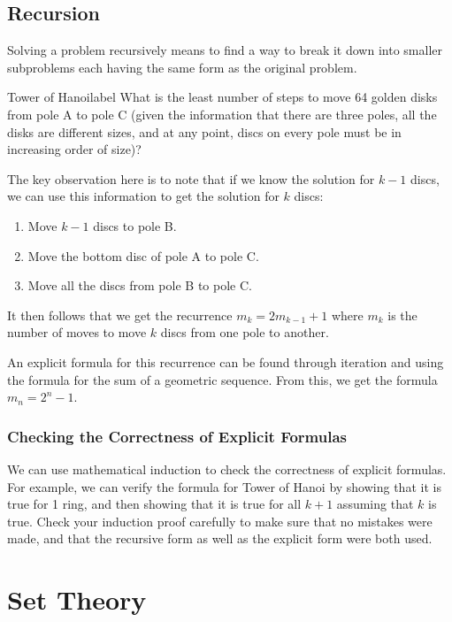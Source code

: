\documentclass[a4paper]{report}
\begin{document}
\section{Recursion}

Solving a problem recursively means to find a way to break it down into smaller subproblems each having the same form as the original problem.

\begin{example}{Tower of Hanoi}{label}
    What is the least number of steps to move 64 golden disks from pole A to pole C (given the information that
    there are three poles, all the disks are different sizes, and at any point, discs on every pole must be in
    increasing order of size)?
\end{example}

The key observation here is to note that if we know the solution for $k-1$ discs, we can use this information to
get the solution for $k$ discs:

\begin{enumerate}
    \item Move $k-1$ discs to pole B.
    \item Move the bottom disc of pole A to pole C.
    \item Move all the discs from pole B to pole C.
\end{enumerate}

It then follows that we get the recurrence $m_k=2m_{k-1}+1$ where $m_k$ is the number of moves to move $k$ discs from
one pole to another.

An explicit formula for this recurrence can be found through iteration and using the formula for the sum of a geometric
sequence. From this, we get the formula $m_n = 2^n-1$.

\subsection{Checking the Correctness of Explicit Formulas}

We can use mathematical induction to check the correctness of explicit formulas. For example, we can verify the formula for
Tower of Hanoi by showing that it is true for 1 ring, and then showing that it is true for all $k+1$ assuming that $k$ is true.
Check your induction proof carefully to make sure that no mistakes were made, and that the recursive form as well as the
explicit form were both used.


\chapter{Set Theory}
\end{document}
